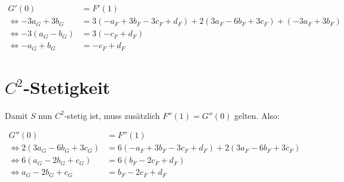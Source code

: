 \documentclass[a4paper]{scrartcl}
\begin{document}
    \begin{align}
        G'(0) &= F'(1)\\
    \Leftrightarrow -3 a_G+3 b_G
        &= 3 (-a_F + 3 b_F-3 c_F+d_F) + 2 (3 a_F-6 b_F+3 c_F) + (-3 a_F+3 b_F)\\
    \Leftrightarrow -3 (a_G-b_G) &= 3 (- c_F+d_F)\\
    \Leftrightarrow -a_G + b_G &= - c_F + d_F
    \end{align}

    \section{$C^2$-Stetigkeit}
    Damit $S$ nun $C^2$-stetig ist, muss zusätzlich $F''(1) = G''(0)$ gelten. Also:

    \begin{align}
        G''(0) &= F''(1)\\
        \Leftrightarrow 2 (3 a_G-6 b_G+3 c_G)
                     &= 6 (-a_F + 3 b_F-3 c_F+d_F) + 2 (3 a_F-6 b_F+3 c_F)\\
        \Leftrightarrow 6 (a_G - 2 b_G + c_G) &= 6 (b_F-2 c_F+d_F)\\
        \Leftrightarrow a_G - 2 b_G + c_G &= b_F-2 c_F+d_F
    \end{align}
\end{document}
